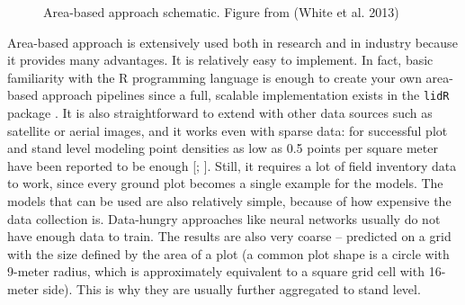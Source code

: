 \begin{figure}
\caption[Area-based approach schematic]{\label{fig-aba-schema}Area-based approach schematic. Figure
from (White et al. 2013)}
\end{figure}

Area-based approach is extensively used both in research and in industry because it provides many advantages.
It is relatively easy to implement.
In fact, basic familiarity with the R programming language is enough to create your own area-based approach pipelines since a full, scalable implementation exists in the \texttt{lidR} package \citep{rousselLidRPackage2020}.
It is also straightforward to extend with other data sources such as satellite or aerial images, and it works even with sparse data: for successful plot and stand level modeling point densities as low as 0.5 points per square meter have been reported to be enough [\citet{treitzLiDARSamplingDensity2012}; \citet{jakubowskiTradeoffsLidarPulse2013}].
Still, it requires a lot of field inventory data to work, since every ground plot becomes a single example for the models.
The models that can be used are also relatively simple, because of how expensive the data collection is.
Data-hungry approaches like neural networks usually do not have enough data to train.
The results are also very coarse – predicted on a grid with the size defined by the area of a plot (a common plot shape is a circle with 9-meter radius, which is approximately equivalent to a square grid cell with 16-meter side).
This is why they are usually further aggregated to stand level.

